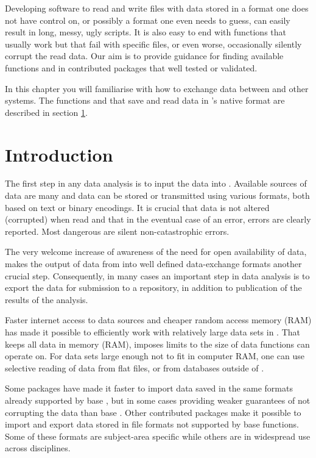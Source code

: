 \documentclass[krantz2]{krantz}\usepackage{knitr}%
\begin{document}
Developing software to read and write files with data stored in a format one does not have control on, or possibly a format one even needs to guess, can easily result in long, messy, ugly \Rlang scripts. It is also easy to end with functions that usually work but that fail with specific files, or even worse, occasionally silently corrupt the read data. Our aim is to provide guidance for finding available \Rlang functions and in contributed packages that well tested or validated.

In this chapter you will familiarise with how to exchange data between \Rlang and other systems. The functions  and  that save and read data in \Rlang's native format are described in section \ref{}.

\section{Introduction}

The first step in any data analysis is to input the data into \Rlang. Available sources of data are many and data can be stored or transmitted using various formats, both based on text or binary encodings. It is crucial that data is not altered (corrupted) when read and that in the eventual case of an error, errors are clearly reported. Most dangerous are silent non-catastrophic errors.

The very welcome increase of awareness of the need for open availability of data, makes the output of data from \Rlang into well defined data-exchange formats another crucial step. Consequently, in many cases an important step in data analysis is to export the data for submission to a repository, in addition to publication of the results of the analysis.

Faster internet access to data sources and cheaper random access memory (RAM) has made it possible to efficiently work with relatively large data sets in \Rlang. That \Rlang keeps all data in memory (RAM), imposes limits to the size of data \Rlang functions can operate on. For data sets large enough not to fit in computer RAM, one can use selective reading of data from flat files, or from databases outside of \Rlang.

Some \Rlang packages have made it faster to import data saved in the same formats already supported by base \Rlang, but in some cases providing weaker guarantees of not corrupting the data than base \Rlang. Other contributed packages make it possible to import and export data stored in file formats not supported by base \Rlang functions. Some of these formats are subject-area specific while others are in widespread use across disciplines.
\end{document}
